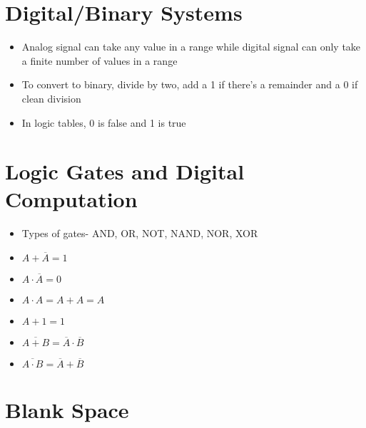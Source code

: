 \documentclass [12pt] {article}
\begin{document}
\begin{multicols*}{2}
	\section{Digital/Binary Systems}
	\begin{itemize}
		\item Analog signal can take any value in a range while digital signal can only take a finite number of values in a range
		\item To convert to binary, divide by two, add a 1 if there's a remainder and a 0 if clean division
		\item In logic tables, 0 is false and 1 is true
	\end{itemize}
		\section{Logic Gates and Digital Computation}
	\begin{itemize}
		\item Types of gates- AND, OR, NOT, NAND, NOR, XOR
		\item $A + \overline{A} = 1$
		\item $A \cdot \overline{A} = 0$
		\item $A \cdot A = A + A = A$
		\item $A + 1 = 1$
		\item $\overline{A + B} = \overline{A}\cdot\overline{B}$
		\item $\overline{A\cdot B} = \overline{A} + \overline{B}$
	\end{itemize}
	\newpage
	\section{Blank Space}
\end{multicols*}
\end{document}
